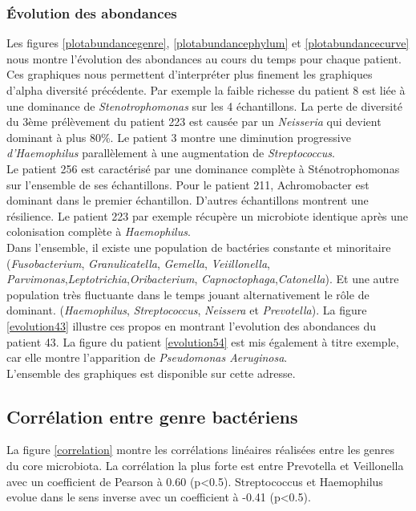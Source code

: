 \documentclass[12pt,a4paper]{article}
\begin{document}
\subsubsection{Évolution des abondances}
Les figures \ref{plotabundancegenre}, \ref{plotabundancephylum} et \ref{plotabundancecurve} nous montre l’évolution des abondances au cours du temps pour chaque patient. Ces graphiques nous permettent d’interpréter plus finement les graphiques d’alpha diversité précédente.
Par exemple la faible richesse du patient 8 est liée à une dominance de \textit{Stenotrophomonas} sur les 4 échantillons.
La perte de diversité du 3ème prélèvement du patient 223 est causée par un \textit{Neisseria} qui devient dominant à plus 80\%.
Le patient 3 montre une diminution progressive \textit{d’Haemophilus} parallèlement à une augmentation de \textit{Streptococcus}. \\
Le patient 256 est caractérisé par une dominance complète à Sténotrophomonas sur l'ensemble de ses échantillons. Pour le patient 211, Achromobacter est dominant dans le premier échantillon.
D’autres échantillons montrent une résilience. Le patient 223 par exemple récupère un microbiote identique après une colonisation complète à \textit{Haemophilus}. \\
Dans l’ensemble, il existe une population de bactéries constante et minoritaire (\textit{Fusobacterium}, \textit{Granulicatella}, \textit{Gemella}, \textit{Veiillonella}, \textit{Parvimonas},\textit{Leptotrichia},\textit{Oribacterium}, \textit{Capnoctophaga},\textit{Catonella}). Et une autre population très fluctuante dans le temps jouant alternativement le rôle de dominant. (\textit{Haemophilus}, \textit{Streptococcus}, \textit{Neissera} et \textit{Prevotella}).
La figure \ref{evolution43} illustre ces propos en montrant l'evolution des abondances du patient 43.
La figure du patient \ref{evolution54} est mis également à titre exemple, car elle montre l’apparition de \textit{Pseudomonas Aeruginosa}. \\
L’ensemble des graphiques est disponible sur cette adresse.

\subsection{Corrélation entre genre bactériens}
La figure \ref{correlation} montre les corrélations linéaires réalisées entre les genres du core microbiota. La corrélation la plus forte est entre Prevotella et Veillonella avec un coefficient de Pearson à 0.60 (p<0.5).  Streptococcus et Haemophilus evolue dans le sens inverse avec un coefficient à -0.41  (p<0.5). 
 
\end{document}
